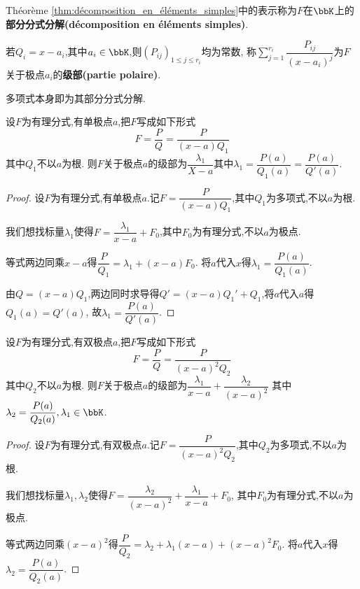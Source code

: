\begin{rqq}
    Théorème \ref{thm:décomposition_en_éléments_simples}中的表示称为$F$在$\bbK$上的
    \textbf{部分分式分解(décomposition en éléments simples)}.
\end{rqq}

\begin{rqq}
    若$Q_i = x - a_i$,其中$a_i \in \bbK$,则$(P_{ij})_{1 \leqslant j \leqslant r_i}$均为常数,
    称$\sum\limits_{j = 1}^{r_i} \dfrac{P_{ij}}{(x - a_i)^j}$为$F$关于极点$a_i$的\textbf{级部(partie polaire)}.
\end{rqq}

\begin{rqq}
    多项式本身即为其部分分式分解.
\end{rqq}

\begin{prop}
    设$F$为有理分式,有单极点$a$,把$F$写成如下形式\[ F = \dfrac{P}{Q} = \dfrac{P}{(x - a)Q_1} \]其中$Q_1$不以$a$为根.
    则$F$关于极点$a$的级部为$\dfrac{\lambda_1}{X - a}$其中$\lambda_1 = \dfrac{P(a)}{Q_1(a)} = \dfrac{P(a)}{Q'(a)}$.
\end{prop}

\begin{proof}
    设$F$为有理分式,有单极点$a$.记$F = \dfrac{P}{(x - a)Q_1}$,其中$Q_1$为多项式,不以$a$为根.

    我们想找标量$\lambda_1$使得$F = \dfrac{\lambda_1}{x - a} + F_0$,其中$F_0$为有理分式,不以$a$为极点.
    
    等式两边同乘$x - a$得$\dfrac{P}{Q_1} = \lambda_1 + (x - a)F_0$.
    将$a$代入$x$得$\lambda_1 = \dfrac{P(a)}{Q_1(a)}$.

    由$Q = (x - a)Q_1$,两边同时求导得$Q' = (x - a)Q_1' + Q_1$,将$a$代入$a$得$Q_1(a) = Q'(a)$,
    故$\lambda_1 = \dfrac{P(a)}{Q'(a)}$.
\end{proof}

\begin{prop}
    设$F$为有理分式,有双极点$a$,把$F$写成如下形式\[ F = \dfrac{P}{Q} = \dfrac{P}{(x - a)^2 Q_2} \]其中$Q_2$不以$a$为根.
    则$F$关于极点$a$的级部为$\dfrac{\lambda_1}{x - a} + \dfrac{\lambda_2}{(x - a)^2}$
    其中$\lambda_2 = \dfrac{P(a)}{Q_2(a)}, \lambda_1 \in \bbK$.
\end{prop}

\begin{proof}
    设$F$为有理分式,有双极点$a$.记$F = \dfrac{P}{(x - a)^2Q_2}$,其中$Q_2$为多项式,不以$a$为根.

    我们想找标量$\lambda_1, \lambda_2$使得$F = \dfrac{\lambda_2}{(x - a)^2} + \dfrac{\lambda_1}{x - a} + F_0$,
    其中$F_0$为有理分式,不以$a$为极点.

    等式两边同乘$(x - a)^2$得$\dfrac{P}{Q_2} = \lambda_2 + \lambda_1 (x - a) + (x - a)^2F_0$.
    将$a$代入$x$得$\lambda_2 = \dfrac{P(a)}{Q_2(a)}$.
\end{proof}

